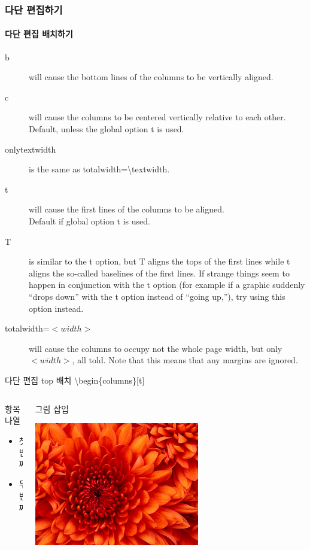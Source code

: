 \documentclass[9pt,blue,xcolor=pdftex,dvipsnames,table,handout,notes]{beamer}
\begin{document}
		\begin{frame}[t]
		\frametitle{다단 편집하기}
		\framesubtitle{다단 편집 배치하기}

			\begin{description}
			\item[b] will cause the bottom lines of the columns to be vertically aligned.
			\item[c] will cause the columns to be centered vertically relative to each other. Default, unless the global option t is used.
			\item[onlytextwidth] is the same as totalwidth=\textbackslash textwidth.
			\item[t] will cause the first lines of the columns to be aligned. \\
					Default if global option t is used.
			\item[T] is similar to the t option, but T aligns the tops of the first lines while t aligns the so-called baselines
			of the first lines. If strange things seem to happen in conjunction with the t option (for example if a
			graphic suddenly “drops down” with the t option instead of “going up,”), try using this option instead.
			\item[totalwidth=\(<width>\)] will cause the columns to occupy not the whole page width, but only \( <width> \),
					all told. Note that this means that any margins are ignored.
			\end{description}


			\begin{example} {다단 편집 top 배치}
			\textbackslash begin\{columns\}[t]
			\end{example}



		\begin{columns}[T]
		\begin{column}{.5\textwidth}
			\begin{block} {항목 나열}
			\begin{itemize}
			\item 첫 번째
			\item 두 번째
			\end{itemize}
			\end{block}

		\end{column}

		\begin{column}{.4\textwidth}
			\begin{block} {그림 삽입}
			\centerline{\includegraphics[scale=1.0,width=0.6\textwidth]{./fig/Chrysanthemum.jpg}}
			\end{block}


\end{column}
\end{columns}
\end{frame}
\end{document}
